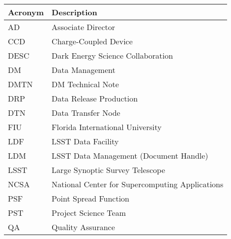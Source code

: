 \addtocounter{table}{-1}
\begin{longtable}{|l|p{}|}\hline
\textbf{Acronym} & \textbf{Description}  \\\hline

AD & Associate Director \\\hline
CCD & Charge-Coupled Device \\\hline
DESC & Dark Energy Science Collaboration \\\hline
DM & Data Management \\\hline
DMTN & \gls{DM} Technical Note \\\hline
DRP & Data Release Production \\\hline
DTN & Data Transfer Node \\\hline
FIU & Florida International University \\\hline
LDF & \gls{LSST} Data Facility \\\hline
LDM & \gls{LSST} Data Management (Document Handle) \\\hline
LSST & Large Synoptic Survey Telescope \\\hline
NCSA & National Center for Supercomputing Applications \\\hline
PSF & Point Spread Function \\\hline
PST & Project Science Team \\\hline
QA & Quality Assurance \\\hline
\end{longtable}
